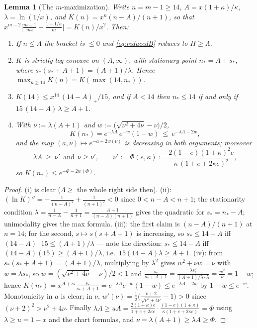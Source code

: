 \documentclass[11pt]{article}
\newtheorem{lemma}[theorem]{Lemma}
\begin{document}
\begin{lemma}[The $m$-maximization]\label{lem:Kmax}
Write $n=m-1\ge14$, $A=x(1+\kappa)/\kappa$, $\lambda=\ln(1/x)$, and
$K(n)=x^n(n-A)/(n+1)$, so that
$x^{m-2}\bigl[\frac{m-1}{mx}-\frac{1+1/\kappa}m\bigr]=K(n)/x^2$.  Then:
\begin{enumerate}[label=\textup{(\roman*)}]
\item If $n\le A$ the bracket is $\le0$ and \eqref{eq:reducedB} reduces to
$\Pi\ge\Lambda$.
\item $K$ is strictly log-concave on $(A,\infty)$, with stationary point
$n_*=A+s_*$, where $s_*(s_*+A+1)=(A+1)/\lambda$.  Hence
$\max_{n\ge14}K(n)=K(\max(14,n_*))$.
\item $K(14)\le x^{14}\,(14-A)_+/15$, and if $A<14$ then $n_*\le14$ if and
only if $15\,(14-A)\,\lambda\ge A+1$.
\item With $\nu:=\lambda(A+1)$ and $w:=\bigl(\sqrt{\nu^2+4\nu}-\nu\bigr)/2$,
\[
        K(n_*)=e^{-\lambda A}\,e^{-w}(1-w)\ \le\ e^{-\lambda A-2w},
\]
and the map $(a,\nu)\mapsto e^{-a-2w(\nu)}$ is decreasing in both arguments;
moreover
\[
        \lambda A\ \ge\ \nu'\ \ \text{and}\ \ \nu\ge\nu',
        \qquad
        \nu':=\Phi(e,\kappa):=\frac{2(1-e)(1+\kappa)^2e}{\kappa\,(1+e+2\kappa e)^2},
\]
so $K(n_*)\le e^{-\Phi-2w(\Phi)}$.
\end{enumerate}
\end{lemma}

\begin{proof}
(i) is clear ($\Lambda\ge$ the whole right side then).  (ii): $(\ln K)''=
-\frac1{(n-A)^2}+\frac1{(n+1)^2}<0$ since $0<n-A<n+1$; the stationarity
condition $\lambda=\frac1{n-A}-\frac1{n+1}=\frac{A+1}{(n-A)(n+1)}$ gives the
quadratic for $s_*=n_*-A$; unimodality gives the max formula.  (iii): the
first claim is $(n-A)/(n+1)$ at $n=14$; for the second,
$s\mapsto s(s+A+1)$ is increasing, so $s_*\le14-A$ iff
$(14-A)\cdot15\le(A+1)/\lambda$ --- note the direction: $s_*\le14-A$ iff
$(14-A)(15)\ge(A+1)/\lambda$, i.e.\ $15(14-A)\lambda\ge A+1$.  (iv): from
$s_*(s_*+A+1)=(A+1)/\lambda$, multiplying by $\lambda^2$ gives
$w^2+\nu w=\nu$ with $w=\lambda s_*$, so $w=(\sqrt{\nu^2+4\nu}-\nu)/2<1$ and
$\frac{s_*}{s_*+A+1}=\frac{\lambda s_*^2}{(A+1)/\lambda\cdot\lambda}
=\frac{w^2}\nu=1-w$; hence
$K(n_*)=x^{A+s_*}\frac{s_*}{s_*+A+1}=e^{-\lambda A}e^{-w}(1-w)
\le e^{-\lambda A-2w}$ by $1-w\le e^{-w}$.  Monotonicity in $a$ is clear; in
$\nu$, $w'(\nu)=\frac12\bigl(\frac{\nu+2}{\sqrt{\nu^2+4\nu}}-1\bigr)>0$
since $(\nu+2)^2>\nu^2+4\nu$.  Finally
$\lambda A\ge uA=\frac{2(1+\kappa)e}{1+e+2\kappa e}\cdot
\frac{(1-e)(1+\kappa)}{\kappa(1+e+2\kappa e)}=\Phi$ using $\lambda\ge u=1-x$
and the chart formulas, and $\nu=\lambda(A+1)\ge\lambda A\ge\Phi$.
\end{proof}
\end{document}
